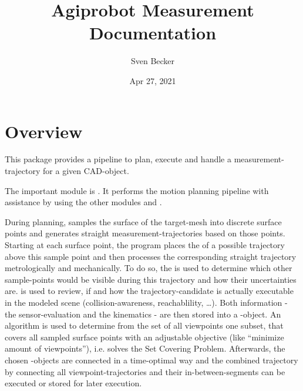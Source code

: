 \documentclass[letterpaper,10pt,english]{sphinxmanual}
\title{Agiprobot Measurement Documentation}
\date{Apr 27, 2021}
\author{Sven Becker}
\begin{document}
\maketitle
\sphinxtableofcontents
{}\label{\detokenize{index::doc}}



\chapter{Overview}
\label{\detokenize{overview:overview}}\label{\detokenize{overview::doc}}\label{\detokenize{overview:agiprobot-measurement-s-documentation}}
This package provides a pipeline to plan, execute and handle a measurement-trajectory for a given CAD-object.

\begin{figure}[htbp]
\centering

\noindent{}
\end{figure}

The important module is {\hyperref[\detokenize{module_trajectory_manager:trajectory-manager}]{}}. It performs the motion planning pipeline with assistance by using the other modules {\hyperref[\detokenize{module_view:viewpoint}]{}} and {\hyperref[\detokenize{module_sensor_model:sensor-model}]{}}.

During planning, {\hyperref[\detokenize{module_trajectory_manager:trajectory-manager}]{}} samples the surface of the target-mesh into discrete surface points and generates straight measurement-trajectories based on those points.
Starting at each surface point, the program places the  of a possible trajectory above this sample point and then processes the corresponding straight trajectory metrologically and mechanically.
To do so, the {\hyperref[\detokenize{module_sensor_model:sensor-model}]{}} is used to determine which other sample-points would be visible during this trajectory and how their uncertainties are.  is used to
review, if and how the trajectory-candidate is actually executable in the modeled scene (collision-awareness, reachablility, …). Both information - the sensor-evaluation and the kinematics - are then stored
into a {\hyperref[\detokenize{module_view:viewpoint}]{}}-object. An algorithm is used to determine from the set of all viewpoints one subset, that covers all sampled surface points with an adjustable objective (like “minimize amount of viewpoints”), i.e. solves
the Set Covering Problem.
Afterwards, the chosen {\hyperref[\detokenize{module_view:viewpoint}]{}}-objects are connected in a time-optimal way and the combined trajectory by connecting all viewpoint-trajectories and their in-between-segments can be executed or stored for later execution.
\end{document}
